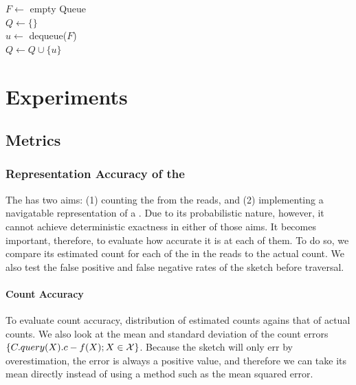 \begin{algorithm}
	\caption{$T.\mathit{traverse}(\strsetname{S}, t)$}\label{alg:dbht-navigate}
  $F \gets$ empty Queue\\
  $Q \gets \{\}$\\
   {
    $u \gets$ dequeue($F$)\\
    $Q \gets Q \cup \{u\}$\\
  }
\end{algorithm}

\section{Experiments}

\subsection{Metrics}


\subsubsection{Representation Accuracy of the \dBCM}

The \dBCM has two aims: (1) counting the  from the reads, and (2) implementing a navigatable representation of a \dBG. Due to its probabilistic nature, however, it cannot achieve deterministic exactness in either of those aims. It becomes important, therefore, to evaluate how accurate it is at each of them. To do so, we compare its estimated count for each of the  in the reads to the  actual count. We also test the false positive and false negative rates of the sketch before traversal.

\paragraph{Count Accuracy} To evaluate count accuracy, distribution of estimated counts agains that of actual counts. We also look at the mean and standard deviation of the count errors $\{C.query(X).c - f(X) ; X \in \readset\}$. Because the \cm sketch will only err by overestimation, the error is always a positive value, and therefore we can take its mean directly instead of using a method such as the mean squared error.

